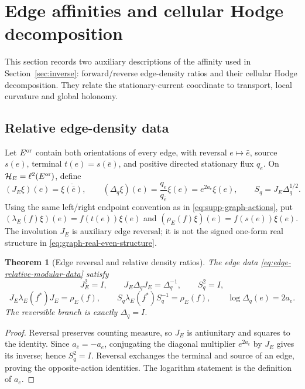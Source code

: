 \documentclass[11pt]{article}
\newtheorem{theorem}{Theorem}[section]
\theoremstyle{definition}
\theoremstyle{remark}
\theoremstyle{definition}
\theoremstyle{remark}
\newcommand{\Hh}{\mathcal H}
\begin{document}
\section{Edge affinities and cellular Hodge decomposition}
\label{app:edge-affinity}

This section records two auxiliary descriptions of the affinity used in
Section~\ref{sec:inverse}: forward/reverse edge-density ratios and their
cellular Hodge decomposition.  They relate the stationary-current coordinate
to transport, local curvature and global holonomy.

\subsection{Relative edge-density data}

Let $E^{\rm or}$ contain both orientations of every edge, with reversal
$e\mapsto\bar e$, source $s(e)$, terminal $t(e)=s(\bar e)$, and positive
directed stationary flux $q_e$.  On $\Hh_E=\ell^2(E^{\rm or})$, define
\begin{equation}
 (J_E\xi)(e)=\overline{\xi(\bar e)},
 \qquad
 (\Delta_q\xi)(e)=\frac{q_e}{q_{\bar e}}\xi(e)=e^{2a_e}\xi(e),
 \qquad
 S_q=J_E\Delta_q^{1/2}.
 \label{eq:edge-relative-modular-data}
\end{equation}
Using the same left/right endpoint convention as in
\eqref{eq:supp-graph-actions}, put
$(\lambda_E(f)\xi)(e)=f(t(e))\xi(e)$ and
$(\rho_E(f)\xi)(e)=f(s(e))\xi(e)$.
The involution $J_E$ is auxiliary edge reversal; it is not the signed
one-form real structure in \eqref{eq:graph-real-even-structure}.

\begin{theorem}[Edge reversal and relative density ratios]
\label{thm:edge-relative-modular-identities}
The edge data \eqref{eq:edge-relative-modular-data} satisfy
\begin{equation}
 {
 J_E^2=I,
 \qquad
 J_E\Delta_qJ_E=\Delta_q^{-1},
 \qquad
 S_q^2=I,}
 \label{eq:edge-reversal-identities}
\end{equation}
\begin{equation}
 {
 J_E\lambda_E(f^*)J_E=\rho_E(f),
 \qquad
 S_q\lambda_E(f^*)S_q^{-1}=\rho_E(f),
 \qquad
 \log\Delta_q(e)=2a_e.}
 \label{eq:edge-opposite-identities}
\end{equation}
The reversible branch is exactly $\Delta_q=I$.
\end{theorem}

\begin{proof}
Reversal preserves counting measure, so $J_E$ is antiunitary and squares to
the identity.  Since $a_{\bar e}=-a_e$, conjugating the diagonal multiplier
$e^{2a_e}$ by $J_E$ gives its inverse; hence $S_q^2=I$.  Reversal exchanges
the terminal and source of an edge, proving the opposite-action identities.
The logarithm statement is the definition of $a_e$.
\end{proof}
\end{document}
